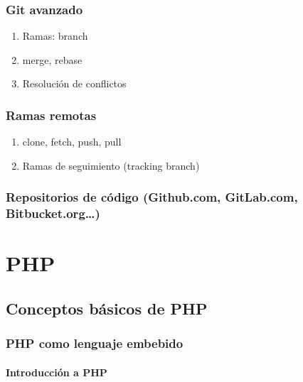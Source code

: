 \documentclass[a4paper,11pt,spanish]{sphinxmanual}
\begin{document}
\section{Git avanzado}
\label{\detokenize{introduccion:id46}}\begin{enumerate}
\item {} 
Ramas: branch

\item {} 
merge, rebase

\item {} 
Resolución de conflictos

\end{enumerate}


\section{Ramas remotas}
\label{\detokenize{introduccion:id47}}\begin{enumerate}
\item {} 
clone, fetch, push, pull

\item {} 
Ramas de seguimiento (tracking branch)

\end{enumerate}


\section{Repositorios de código (Github.com, GitLab.com, Bitbucket.org…)}
\label{\detokenize{introduccion:id48}}

\part{PHP}
\label{\detokenize{php:php}}\label{\detokenize{php::doc}}

\chapter{Conceptos básicos de PHP}
\label{\detokenize{php:conceptos-basicos-de-php}}

\section{PHP como lenguaje embebido}
\label{\detokenize{php:php-como-lenguaje-embebido}}

\subsection{Introducción a PHP}
\label{\detokenize{php:introduccion-a-php}}
\end{document}
